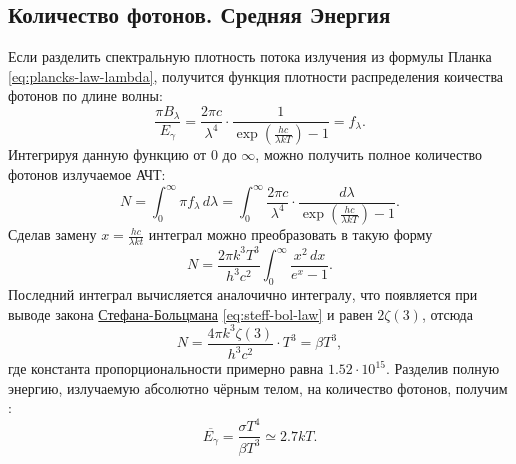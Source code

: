 \subsection{Количество фотонов. Средняя Энергия}
Если разделить спектральную плотность потока излучения из формулы Планка \eqref{eq:plancks-law-lambda}, получится функция плотности распределения коичества фотонов по длине волны:
\begin{equation*}
    \frac{\pi B_{\lambda}}{E_{\gamma}} = \frac{2 \pi c}{\lambda^4} \cdot \frac{1}{\exp\left(\frac{hc}{\lambda k T}\right)-1} = f_{\lambda}.
\end{equation*}
Интегрируя данную функцию от 0 до $\infty$, можно получить полное количество фотонов излучаемое АЧТ:
\begin{equation*}
    N = \int_{0}^{\infty}{\pi f_{\lambda}\,d\lambda} = \int_{0}^{\infty}{\frac{2\pi c}{\lambda^4} \cdot \frac{d\lambda}{\exp\left(\frac{hc}{\lambda k T}\right)-1}}.
\end{equation*}
Сделав замену $x = \frac{hc}{\lambda kt}$ интеграл можно преобразовать в такую форму
\begin{equation*}
    N = \frac{2\pi k^3 T^3}{h^3 c^2}\int_{0}^{\infty}{\frac{x^2 \,dx}{e^x-1}}.
\end{equation*}
Последний интеграл вычисляется аналочично интегралу, что появляется при выводе закона \hyperref[subsec:stef-boltz-law]{Стефана-Больцмана} \eqref{eq:steff-bol-law} и равен $2\zeta(3)$, отсюда
\begin{equation}
    N = \frac{4\pi k^3 \zeta(3)}{h^3 c^2} \cdot T^3 = \beta T^3,
\end{equation}
где константа пропорциональности примерно равна $1.52 \cdot 10^{15}$. 
Разделив полную энергию, излучаемую абсолютно чёрным телом, на количество фотонов, получим :
\begin{equation}
    \overline{E_{\gamma}} = \frac{\sigma T^4}{\beta T^3} \simeq 2.7 k T.
\end{equation}
